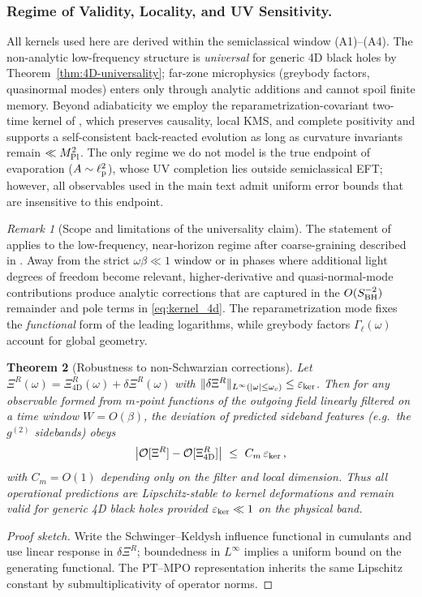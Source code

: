 \documentclass[11pt,a4paper]{article}
\newcommand{\gII}{g^{(2)}}
\theoremstyle{plain}
\newtheorem{theorem}{Theorem}
\theoremstyle{definition}
\theoremstyle{remark}
\newtheorem{remark}[theorem]{Remark}
\begin{document}
\subsubsection{Regime of Validity, Locality, and UV Sensitivity.}
All kernels used here are derived within the semiclassical window (A1)--(A4). The non-analytic low-frequency structure is \emph{universal} for generic 4D black holes by Theorem~\ref{thm:4D-universality}; far-zone microphysics (greybody factors, quasinormal modes) enters only through analytic additions and cannot spoil finite memory. Beyond adiabaticity we employ the reparametrization-covariant two-time kernel of , which preserves causality, local KMS, and complete positivity and supports a self-consistent back-reacted evolution as long as curvature invariants remain $\ll M_{\rm Pl}^2$. The only regime we do not model is the true endpoint of evaporation ($A\sim \ell_{\rm p}^2$), whose UV completion lies outside semiclassical EFT; however, all observables used in the main text admit uniform error bounds that are insensitive to this endpoint.


\begin{remark}[Scope and limitations of the universality claim]\label{rem:universality-scope}
The statement of  applies to the low-frequency, near-horizon regime after coarse-graining described in .
Away from the strict $\omega\beta\ll 1$ window or in phases where additional light degrees of freedom become relevant,
higher-derivative and quasi-normal-mode contributions produce analytic corrections that are captured in the $O(S_{\rm BH}^{-2})$ remainder and pole terms in \eqref{eq:kernel_4d}.
The reparametrization mode fixes the \emph{functional} form of the leading logarithms, while greybody factors $\Gamma_\ell(\omega)$ account for global geometry.
\end{remark}

\begin{theorem}[Robustness to non-Schwarzian corrections]\label{thm:4D-robustness}
Let $\Xi^R(\omega)=\Xi^R_{4\mathrm{D}}(\omega)+\delta\Xi^R(\omega)$ with $\|\delta\Xi^R\|_{L^\infty(|\omega|\le\omega_c)}\le \varepsilon_{\rm ker}$.
Then for any observable formed from $m$-point functions of the outgoing field linearly filtered on a time window $W=O(\beta)$,
the deviation of predicted sideband features (e.g.\ the $\gII$ sidebands) obeys
\[
\big|\mathcal{O}[\Xi^R]-\mathcal{O}[\Xi^R_{4\mathrm{D}}]\big|\ \le\ C_m\,\varepsilon_{\rm ker}\,,
\]
with $C_m=O(1)$ depending only on the filter and local dimension. Thus all operational predictions are Lipschitz-stable to kernel deformations
and remain valid for generic 4D black holes provided $\varepsilon_{\rm ker}\ll 1$ on the physical band.
\end{theorem}
\begin{proof}[Proof sketch]
Write the Schwinger--Keldysh influence functional in cumulants and use linear response in $\delta\Xi^R$; boundedness in $L^\infty$ implies a uniform bound on the generating functional.
The PT--MPO representation inherits the same Lipschitz constant by submultiplicativity of operator norms.
\end{proof}
\end{document}
